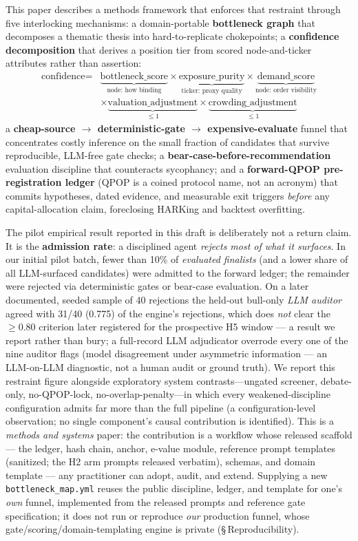 \documentclass[11pt]{article}
\begin{document}
This paper describes a methods framework that enforces that restraint through five
interlocking mechanisms: a domain-portable \textbf{bottleneck graph} that decomposes
a thematic thesis into hard-to-replicate chokepoints; a \textbf{confidence decomposition} that
derives a position tier from scored node-and-ticker attributes rather than assertion:
%
\[
  \begin{aligned}
  \text{confidence} = {}&\underbrace{\text{bottleneck\_score}}_{\text{node: how binding}}
    \times \underbrace{\text{exposure\_purity}}_{\text{ticker: proxy quality}}
    \times \underbrace{\text{demand\_score}}_{\text{node: order visibility}} \\
    &\times \underbrace{\text{valuation\_adjustment}}_{\leq 1}
    \times \underbrace{\text{crowding\_adjustment}}_{\leq 1}
  \end{aligned}
\]
%
a \textbf{cheap-source $\to$ deterministic-gate $\to$ expensive-evaluate} funnel that
concentrates costly inference on the small fraction of candidates that survive
reproducible, LLM-free gate checks; a \textbf{bear-case-before-recommendation} evaluation
discipline that counteracts sycophancy; and a \textbf{forward-QPOP pre-registration ledger}
(QPOP is a coined protocol name, not an acronym)
that commits hypotheses, dated evidence, and measurable exit triggers \emph{before} any
capital-allocation claim, foreclosing HARKing and backtest overfitting.

The pilot empirical result reported in this draft is deliberately not a return claim.
It is the \textbf{admission rate}: a disciplined agent \emph{rejects most of what it
surfaces}.
In our initial pilot batch, fewer than 10\% of \emph{evaluated finalists} (and a lower share of all
LLM-surfaced candidates) were admitted to the
forward ledger; the remainder were rejected via deterministic gates or bear-case evaluation.
On a later documented, seeded sample of 40 rejections the held-out bull-only \emph{LLM auditor}
agreed with 31/40 (0.775) of the engine's rejections, which does \emph{not} clear the
$\geq 0.80$ criterion later registered for the prospective H5 window --- a result we report rather
than bury; a full-record LLM adjudicator overrode every
one of the nine auditor flags (model disagreement under asymmetric information --- an LLM-on-LLM
diagnostic, not a human audit or ground truth).
We report this restraint figure alongside exploratory system contrasts---ungated screener,
debate-only, no-\textsc{QPOP}-lock, no-overlap-penalty---in which every weakened-discipline
configuration admits far more than the full pipeline (a configuration-level observation; no single
component's causal contribution is identified).
This is a \emph{methods and systems} paper: the contribution is a workflow whose released
scaffold --- the ledger, hash chain, anchor, e-value module, reference prompt templates (sanitized;
the H2 arm prompts released verbatim), schemas, and domain
template --- any practitioner can adopt, audit, and extend. Supplying a new
\texttt{bottleneck\_map.yml} reuses the public discipline, ledger, and template for one's
\emph{own} funnel, implemented from the released prompts and reference gate specification; it does
not run or reproduce \emph{our} production funnel, whose gate/scoring/domain-templating engine
is private (\S\,Reproducibility).
\end{document}
